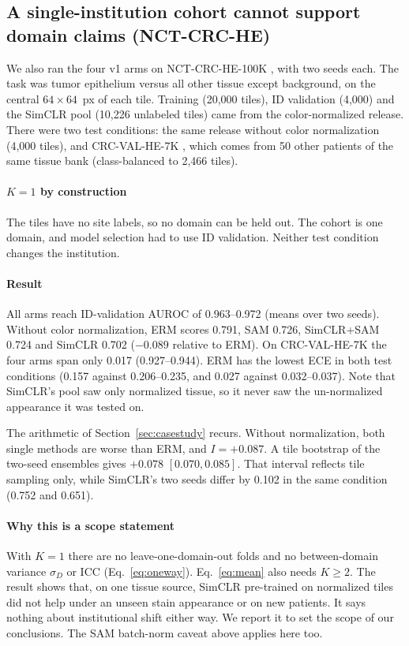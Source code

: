 \subsection{A single-institution cohort cannot support domain claims (NCT-CRC-HE)}
\label{sec:nct}

We also ran the four v1 arms on NCT-CRC-HE-100K \citep{kather2018nct}, with
two seeds each. The task was tumor epithelium versus all other tissue except
background, on the central $64\times64$~px of each tile. Training (20,000
tiles), ID validation (4,000) and the SimCLR pool (10,226 unlabeled tiles)
came from the color-normalized release. There were two test conditions: the
same release without color normalization (4,000 tiles), and CRC-VAL-HE-7K
\citep{kather2019predicting}, which comes from 50 other patients of the same
tissue bank (class-balanced to 2,466 tiles).

\paragraph{$K=1$ by construction} The tiles have no site labels, so no domain
can be held out. The cohort is one domain, and model selection had to use ID
validation. Neither test condition changes the institution.

\paragraph{Result} All arms reach ID-validation AUROC of 0.963--0.972 (means
over two seeds). Without color normalization, ERM scores 0.791, SAM 0.726,
SimCLR+SAM 0.724 and SimCLR 0.702 ($-0.089$ relative to ERM). On CRC-VAL-HE-7K
the four arms span only 0.017 (0.927--0.944). ERM has the lowest ECE in both
test conditions (0.157 against 0.206--0.235, and 0.027 against 0.032--0.037).
Note that SimCLR's pool saw only normalized tissue, so it never saw the
un-normalized appearance it was tested on.

The arithmetic of Section~\ref{sec:casestudy} recurs. Without normalization,
both single methods are worse than ERM, and $I=+0.087$. A tile bootstrap of
the two-seed ensembles gives $+0.078$ $[0.070,0.085]$. That interval reflects
tile sampling only, while SimCLR's two seeds differ by 0.102 in the same
condition (0.752 and 0.651).

\paragraph{Why this is a scope statement} With $K=1$ there are no
leave-one-domain-out folds and no between-domain variance $\sigma_D$ or ICC
(Eq.~\ref{eq:oneway}). Eq.~\ref{eq:mean} also needs $K\ge2$. The result shows
that, on one tissue source, SimCLR pre-trained on normalized tiles did not
help under an unseen stain appearance or on new patients. It says nothing
about institutional shift either way. We report it to set the scope of our conclusions. The SAM
batch-norm caveat above applies here too.
